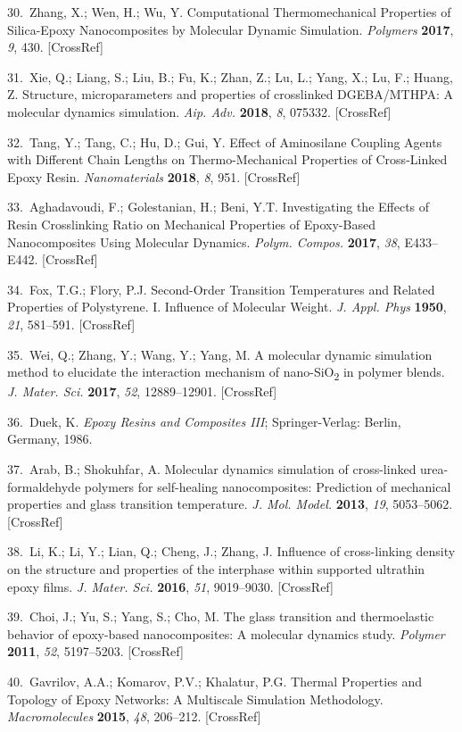 \documentclass{article}
\begin{document}
\begin{hangpars}
30.\ Zhang, X.; Wen, H.; Wu, Y. Computational Thermomechanical Properties of Silica-Epoxy Nanocomposites by Molecular Dynamic Simulation. \emph{Polymers} \textbf{2017}, \emph{9}, 430. [CrossRef]

31.\ Xie, Q.; Liang, S.; Liu, B.; Fu, K.; Zhan, Z.; Lu, L.; Yang, X.; Lu, F.; Huang, Z. Structure, microparameters and properties of crosslinked DGEBA/MTHPA: A molecular dynamics simulation. \emph{Aip. Adv.} \textbf{2018}, \emph{8}, 075332. [CrossRef]

32.\ Tang, Y.; Tang, C.; Hu, D.; Gui, Y. Effect of Aminosilane Coupling Agents with Different Chain Lengths on Thermo-Mechanical Properties of Cross-Linked Epoxy Resin. \emph{Nanomaterials} \textbf{2018}, \emph{8}, 951. [CrossRef]

33.\ Aghadavoudi, F.; Golestanian, H.; Beni, Y.T. Investigating the Effects of Resin Crosslinking Ratio on Mechanical Properties of Epoxy-Based Nanocomposites Using Molecular Dynamics. \emph{Polym. Compos.} \textbf{2017}, \emph{38}, E433–E442. [CrossRef]

34.\ Fox, T.G.; Flory, P.J. Second-Order Transition Temperatures and Related Properties of Polystyrene. I. Influence of Molecular Weight. \emph{J. Appl. Phys} \textbf{1950}, \emph{21}, 581–591. [CrossRef]

35.\ Wei, Q.; Zhang, Y.; Wang, Y.; Yang, M. A molecular dynamic simulation method to elucidate the interaction mechanism of nano-SiO\textsubscript{2} in polymer blends. \emph{J. Mater. Sci.} \textbf{2017}, \emph{52}, 12889–12901. [CrossRef]

36.\ Duek, K. \emph{Epoxy Resins and Composites III}; Springer-Verlag: Berlin, Germany, 1986.

37.\ Arab, B.; Shokuhfar, A. Molecular dynamics simulation of cross-linked urea-formaldehyde polymers for self-healing nanocomposites: Prediction of mechanical properties and glass transition temperature. \emph{J. Mol. Model.} \textbf{2013}, \emph{19}, 5053–5062. [CrossRef]

38.\ Li, K.; Li, Y.; Lian, Q.; Cheng, J.; Zhang, J. Influence of cross-linking density on the structure and properties of the interphase within supported ultrathin epoxy films. \emph{J. Mater. Sci.} \textbf{2016}, \emph{51}, 9019–9030. [CrossRef]

39.\ Choi, J.; Yu, S.; Yang, S.; Cho, M. The glass transition and thermoelastic behavior of epoxy-based nanocomposites: A molecular dynamics study. \emph{Polymer} \textbf{2011}, \emph{52}, 5197–5203. [CrossRef]

40.\ Gavrilov, A.A.; Komarov, P.V.; Khalatur, P.G. Thermal Properties and Topology of Epoxy Networks: A Multiscale Simulation Methodology. \emph{Macromolecules} \textbf{2015}, \emph{48}, 206–212. [CrossRef]
\end{hangpars}
\end{document}
